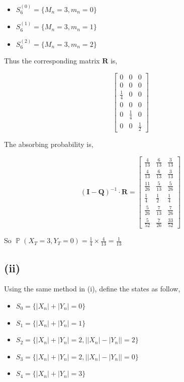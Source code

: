 \documentclass{article}
\DeclareMathOperator{\bP}{\mathbb{P}}
\begin{document}
\begin{itemize}
    \item $S_6^{(0)}= \{M_n= 3,m_n=0\}$
    \item $S_6^{(1)}= \{M_n= 3,m_n=1\}$
    \item $S_6^{(2)}= \{M_n= 3,m_n=2\}$
\end{itemize}

Thus the corresponding matrix $\boldsymbol{R}$ is,

\begin{equation}
    \begin{bmatrix}
        0&0&0\\
        0&0&0\\
        \frac{1}{4} & 0 &0 \\
        0&0&0\\
        0&\frac{1}{4}&0 \\
        0 & 0 & \frac{1}{2}
    \end{bmatrix}
\end{equation}

The absorbing probability is, 

\begin{equation}
    (\boldsymbol{I}-\boldsymbol{Q})^{-1}\cdot \boldsymbol{R} = \begin{bmatrix}
        \frac{4}{13}&\frac{6}{13}&\frac{3}{13}\\
        \frac{4}{13}&\frac{6}{13}&\frac{3}{13}\\
        \frac{11}{26}&\frac{5}{13}&\frac{5}{26} \\
        \frac{1}{4}&\frac{1}{2}&\frac{1}{4}\\
        \frac{5}{26}&\frac{7}{13}&\frac{7}{26}\\
        \frac{5}{52}&\frac{7}{26}&\frac{33}{52}
    \end{bmatrix}
\end{equation}

So $\bP(X_T=3,Y_T=0) = \frac{1}{4} \times \frac{4}{13} = \frac{1}{13}$


\subsection{(ii)}

Using the same method in (i), define the states as follow, 

\begin{itemize}
    \item $S_0 = \{|X_n|+|Y_n| = 0\}$
    \item $S_1 = \{|X_n|+|Y_n| = 1\}$
    \item $S_2 = \{|X_n|+|Y_n| = 2, \big| |X_n|-|Y_n|\big|=2\}$
    \item $S_3= \{|X_n|+|Y_n| = 2, \big| |X_n|-|Y_n|\big|=0\}$
    \item $S_4 = \{|X_n|+|Y_n| = 3\}$
\end{itemize}
\end{document}
